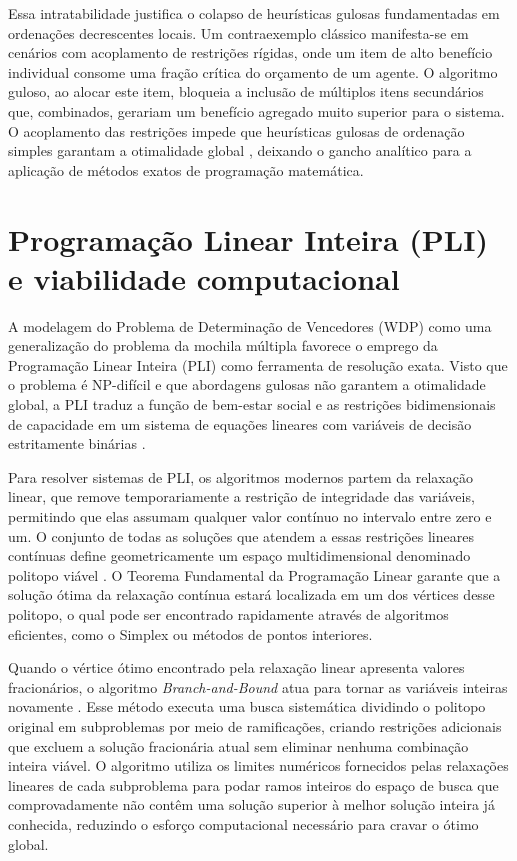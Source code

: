 \documentclass[
    12pt,
    openany,
    oneside,
    a4paper,
    english,
    brazil
]{abntex2}
\begin{document}
Essa intratabilidade justifica o colapso de heurísticas gulosas fundamentadas em ordenações decrescentes locais. Um contraexemplo clássico manifesta-se em cenários com acoplamento de restrições rígidas, onde um item de alto benefício individual consome uma fração crítica do orçamento de um agente. O algoritmo guloso, ao alocar este item, bloqueia a inclusão de múltiplos itens secundários que, combinados, gerariam um benefício agregado muito superior para o sistema. O acoplamento das restrições impede que heurísticas gulosas de ordenação simples garantam a otimalidade global \cite{kellerer2004}, deixando o gancho analítico para a aplicação de métodos exatos de programação matemática.

\section{Programação Linear Inteira (PLI) e viabilidade computacional}
\label{sec:pli_viabilidade}

A modelagem do Problema de Determinação de Vencedores (WDP) como uma generalização do problema da mochila múltipla favorece o emprego da Programação Linear Inteira (PLI) como ferramenta de resolução exata. Visto que o problema é NP-difícil e que abordagens gulosas não garantem a otimalidade global, a PLI traduz a função de bem-estar social e as restrições bidimensionais de capacidade em um sistema de equações lineares com variáveis de decisão estritamente binárias \cite{wolsey1998}.

Para resolver sistemas de PLI, os algoritmos modernos partem da relaxação linear, que remove temporariamente a restrição de integridade das variáveis, permitindo que elas assumam qualquer valor contínuo no intervalo entre zero e um. O conjunto de todas as soluções que atendem a essas restrições lineares contínuas define geometricamente um espaço multidimensional denominado politopo viável \cite{wolsey1998}. O Teorema Fundamental da Programação Linear garante que a solução ótima da relaxação contínua estará localizada em um dos vértices desse politopo, o qual pode ser encontrado rapidamente através de algoritmos eficientes, como o Simplex ou métodos de pontos interiores.

Quando o vértice ótimo encontrado pela relaxação linear apresenta valores fracionários, o algoritmo \textit{Branch-and-Bound} atua para tornar as variáveis inteiras novamente \cite{wolsey1998}. Esse método executa uma busca sistemática dividindo o politopo original em subproblemas por meio de ramificações, criando restrições adicionais que excluem a solução fracionária atual sem eliminar nenhuma combinação inteira viável. O algoritmo utiliza os limites numéricos fornecidos pelas relaxações lineares de cada subproblema para podar ramos inteiros do espaço de busca que comprovadamente não contêm uma solução superior à melhor solução inteira já conhecida, reduzindo o esforço computacional necessário para cravar o ótimo global.
\end{document}
